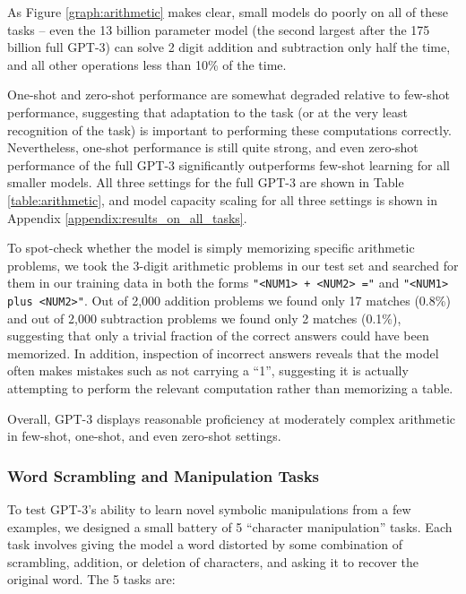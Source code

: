 \documentclass{article}
\begin{document}
As Figure \ref{graph:arithmetic} makes clear, small models do poorly on all of these tasks -- even the 13 billion parameter model (the second largest after the 175 billion full GPT-3) can solve 2 digit addition and subtraction only half the time, and all other operations less than 10\% of the time.

One-shot and zero-shot performance are somewhat degraded relative to few-shot performance, suggesting that adaptation to the task (or at the very least recognition of the task) is important to performing these computations correctly.  Nevertheless, one-shot performance is still quite strong, and even zero-shot performance of the full GPT-3 significantly outperforms few-shot learning for all smaller models.  All three settings for the full GPT-3 are shown in Table \ref{table:arithmetic}, and model capacity scaling for all three settings is shown in Appendix \ref{appendix:results_on_all_tasks}.

To spot-check whether the model is simply memorizing specific arithmetic problems, we took the 3-digit arithmetic problems in our test set and searched for them in our training data in both the forms \texttt{"<NUM1> + <NUM2> ="} and \texttt{"<NUM1> plus <NUM2>"}.  Out of 2,000 addition problems we found only 17 matches (0.8\%) and out of 2,000 subtraction problems we found only 2 matches (0.1\%), suggesting that only a trivial fraction of the correct answers could have been memorized.  In addition, inspection of incorrect answers reveals that the model often makes mistakes such as not carrying a ``1'', suggesting it is actually attempting to perform the relevant computation rather than memorizing a table.

Overall, GPT-3 displays reasonable proficiency at moderately complex arithmetic in few-shot, one-shot, and even zero-shot settings.

        \subsubsection{Word Scrambling and Manipulation Tasks}
        \label{section:Word_Scrambling_and_Manipulation_Tasks}

To test GPT-3's ability to learn novel symbolic manipulations from a few examples, we designed a small battery of 5 ``character manipulation'' tasks.  Each task involves giving the model a word distorted by some combination of scrambling, addition, or deletion of characters, and asking it to recover the original word.  The 5 tasks are:
\end{document}
